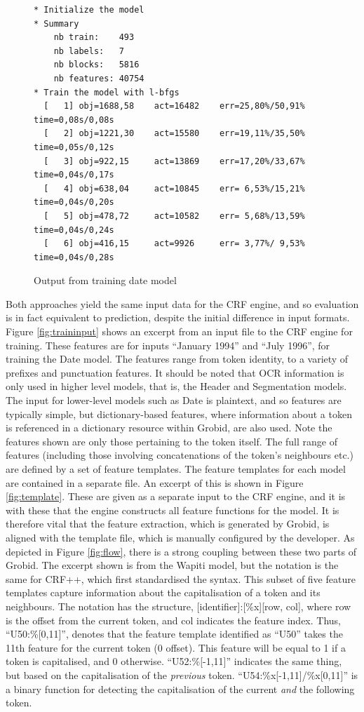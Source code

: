 \begin{figure}
\begin{verbatim}
* Initialize the model
* Summary
    nb train:    493
    nb labels:   7
    nb blocks:   5816
    nb features: 40754
* Train the model with l-bfgs
  [   1] obj=1688,58    act=16482    err=25,80%/50,91% time=0,08s/0,08s
  [   2] obj=1221,30    act=15580    err=19,11%/35,50% time=0,05s/0,12s
  [   3] obj=922,15     act=13869    err=17,20%/33,67% time=0,04s/0,17s
  [   4] obj=638,04     act=10845    err= 6,53%/15,21% time=0,04s/0,20s
  [   5] obj=478,72     act=10582    err= 5,68%/13,59% time=0,04s/0,24s
  [   6] obj=416,15     act=9926     err= 3,77%/ 9,53% time=0,04s/0,28s
\end{verbatim}
\caption{Output from training date model}
\label{fig:output}
\end{figure}

Both approaches yield the same input data for the CRF engine, and so evaluation is in fact equivalent to prediction, despite the initial difference in input formats. Figure \ref{fig:traininput} shows an excerpt from an input file to the CRF engine for training. These features are for inputs ``January 1994'' and ``July 1996'', for training the Date model. The features range from token identity, to a variety of prefixes and punctuation features. It should be noted that OCR information is only used in higher level models, that is, the Header and Segmentation models. The input for lower-level models such as Date is plaintext, and so features are typically simple, but dictionary-based features, where information about a token is referenced in a dictionary resource within Grobid, are also used. Note the features shown are only those pertaining to the token itself. The full range of features (including those involving concatenations of the token's neighbours etc.) are defined by a set of feature templates. The feature templates for each model are contained in a separate file. An excerpt of this is shown in Figure \ref{fig:template}. These are given as a separate input to the CRF engine, and it is with these that the engine constructs all feature functions for the model. It is therefore vital that the feature extraction, which is generated by Grobid, is aligned with the template file, which is manually configured by the developer. As depicted in Figure \ref{fig:flow}, there is a strong coupling between these two parts of Grobid. The excerpt shown is from the Wapiti model, but the notation is the same for CRF++, which first standardised the syntax. This subset of five feature templates capture information about the capitalisation of a token and its neighbours. The notation has the structure, [identifier]:[\%x][row, col], where row is the offset from the current token, and col indicates the feature index. Thus, ``U50:\%[0,11]'', denotes that the feature template identified as ``U50'' takes the 11th feature for the current token (0 offset). This feature will be equal to 1 if a token is capitalised, and 0 otherwise. ``U52:\%[-1,11]'' indicates the same thing, but based on the capitalisation of the \emph{previous} token. ``U54:\%x[-1,11]/\%x[0,11]'' is a binary function for detecting the capitalisation of the current \emph{and} the following token.

